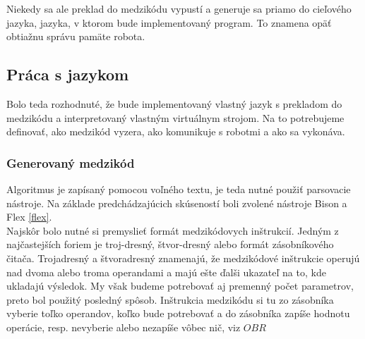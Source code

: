 Niekedy sa ale preklad do medzikódu vypustí a generuje sa priamo do cieľového jazyka, jazyka, v ktorom bude implementovaný program. To znamena opäť obtiažnu správu pamäte robota. \\ %

\subsection{Práca s jazykom}
Bolo teda rozhodnuté, že bude implementovaný vlastný jazyk s prekladom do medzikódu a interpretovaný vlastným virtuálnym strojom. Na to potrebujeme definovať, ako medzikód vyzera, ako komunikuje s robotmi a ako sa vykonáva.

\subsubsection{Generovaný medzikód}
Algoritmus je zapísaný pomocou voľného textu, je teda nutné použiť parsovacie nástroje. Na základe predchádzajúcich skúseností boli zvolené nástroje Bison a Flex \ref{flex}. \\

Najskôr bolo nutné si premyslieť formát medzikódovych inštrukcií. Jedným z najčastejších foriem je troj-dresný, štvor-dresný alebo formát zásobníkového čitača. Trojadresný a štvoradresný znamenajú, že medzikódové inštrukcie operujú nad dvoma alebo troma operandami a majú ešte ďalši ukazateľ na to, kde ukladajú výsledok. My však budeme potrebovať aj premenný počet parametrov, preto bol použitý posledný spôsob. Inštrukcia medzikódu si tu zo zásobníka vyberie toľko operandov, koľko bude potrebovať a do zásobníka zapíše hodnotu operácie, resp. nevyberie alebo nezapíše vôbec nič, viz $OBR$ \\ %

